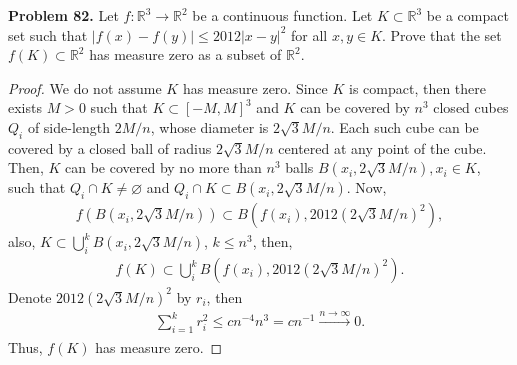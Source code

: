 \documentclass[11pt]{article}
\theoremstyle{definition}
\theoremstyle{definition}
\begin{document}
\medskip

\noindent
{\bf Problem 82.}
Let $f:\mathbb{R}^3\to\mathbb{R}^2$ be a continuous function. Let $K\subset\mathbb{R}^3$ be a compact set such that $|f(x)-f(y)|\leq 2012|x-y|^{2}$
for all $x,y\in K$. Prove that the set $f(K)\subset\mathbb{R}^2$ has measure zero as a subset of $\mathbb{R}^2$.
\begin{proof}
We do not assume $K$ has measure zero. Since $K$ is compact, then there exists $M > 0$ such that $K \subset [-M,M]^3$ and $K$ can be covered by $n^3$ closed cubes $Q_i$ of side-length $2M/n$, whose diameter is $2\sqrt{3}M/n$. Each such cube can be covered by a closed ball of radius $2\sqrt{3}M/n$ centered at any point of the cube. Then, $K$ can be covered by no more than $n^3$ balls $B\left(x_i, 2\sqrt{3}M/n\right), x_i \in K$, such that $Q_i \cap K \neq \varnothing$ and $Q_i \cap K \subset B\left(x_i, 2\sqrt{3}M/n\right)$. Now, 
\begin{align*}
    f\left( B\left(x_i, 2\sqrt{3}M/n\right)\right) \subset B \left(f(x_i), 2012 \left(2\sqrt{3}M/n\right)^2 \right),
\end{align*}
also, $K \subset \bigcup^k_i B\left(x_i, 2\sqrt{3}M/n\right)$, $k \leq n^3$, then,
\begin{align*}
    f(K) \subset \bigcup^k_i B \left(f(x_i), 2012 \left(2\sqrt{3}M/n\right)^2 \right).
\end{align*}
Denote $2012 \left(2\sqrt{3}M/n\right)^2$ by $r_i$, then
\begin{align*}
    \sum^k_{i=1} r_i^2 \leq c n^{-4} n^3 = c n^{-1} \xrightarrow[]{n\to\infty} 0.
\end{align*}
Thus, $f(K)$ has measure zero.
\end{proof}



\medskip
\end{document}
